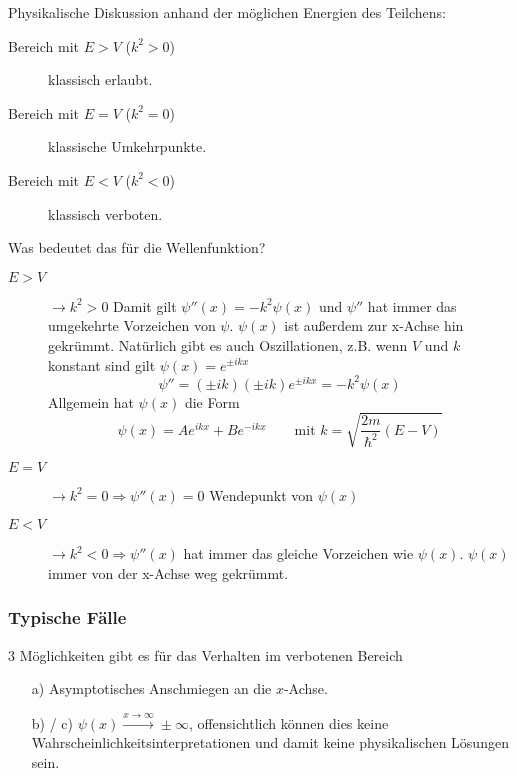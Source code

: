 Physikalische Diskussion anhand der möglichen Energien des Teilchens:
\begin{description}
	\item[Bereich mit $E > V$ ($k^2 > 0$)] klassisch erlaubt.
	\item[Bereich mit $E = V$ ($k^2 = 0$)] klassische Umkehrpunkte.
	\item[Bereich mit $E < V$ ($k^2 < 0$)] klassisch verboten.
\end{description}
Was bedeutet das für die Wellenfunktion?
\begin{description}
\item[$E>V$] $\to k^2 > 0$ Damit gilt $\psi''(x) = -k^2 \psi(x)$ und $\psi''$ hat immer das umgekehrte Vorzeichen von $\psi$. $\psi(x)$ ist außerdem zur x-Achse hin gekrümmt. Natürlich gibt es auch Oszillationen, z.B. wenn $V$ und $k$ konstant sind gilt $\psi(x) = e^{\pm ikx}$
\[\psi'' = (\pm ik)(\pm ik)e^{\pm ikx} = -k^2 \psi(x)\]
Allgemein hat $\psi(x)$ die Form
$$\psi(x) = Ae^{ikx} + Be^{-ikx} \qquad \text{mit~} k=\sqrt{\frac{2m}{\hbar^2}(E-V)}$$
\item[$E=V$] $\to k^2=0 \Rightarrow \psi''(x) = 0$ Wendepunkt von $\psi(x)$
\item[$E<V$] $\to k^2 < 0 \Rightarrow \psi''(x)$ hat immer das gleiche Vorzeichen wie $\psi(x)$. $\psi(x)$ immer von der x-Achse weg gekrümmt.
\end{description}

\subsubsection{Typische Fälle}
3 Möglichkeiten gibt es für das Verhalten im verbotenen Bereich
\begin{itemize}
	\item[a)] Asymptotisches Anschmiegen an die $x$-Achse.
	\item[b) / c)] $\psi(x) \xrightarrow{x \to \infty} \pm \infty$, offensichtlich können dies keine Wahrscheinlichkeitsinterpretationen und damit keine physikalischen Lösungen sein.
\end{itemize}

